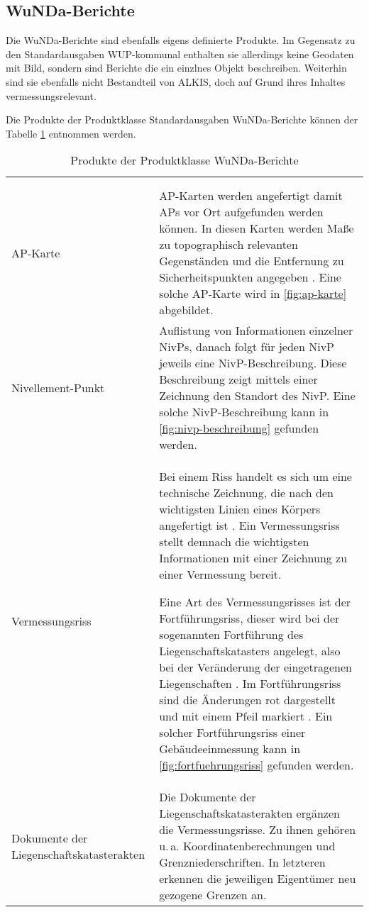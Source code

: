 \subsection{WuNDa-Berichte}
Die WuNDa-Berichte sind ebenfalls eigens definierte Produkte. Im Gegensatz zu den Standardausgaben WUP-kommunal enthalten sie allerdings keine Geodaten mit Bild, sondern sind Berichte die ein einzlnes Objekt beschreiben. Weiterhin sind sie ebenfalls nicht Bestandteil von ALKIS, doch auf Grund ihres Inhaltes vermessungsrelevant.

Die Produkte der Produktklasse Standardausgaben WuNDa-Berichte können der Tabelle \ref{tab-wunda-berichte} entnommen werden.
\begin{longtable}{|p{}|p{}|}	
	\caption{Produkte der Produktklasse WuNDa-Berichte} \label{tab-wunda-berichte} \\
	\hline 
		\rowcolor{gray}
	\head{Produktname}  & \head{Beschreibung} \tabularnewline
	\hline 
	\endfirsthead
	\caption{Produkte der Produktklasse WuNDa-Berichte} \\
	\hline 
		\rowcolor{gray}
	\head{Produktname}  & \head{Beschreibung} \tabularnewline
	\hline 
	\endhead
	AP-Karte
	&
	AP-Karten werden angefertigt damit \acfp{AP} vor Ort aufgefunden werden können. In diesen Karten werden Maße zu topographisch relevanten Gegenständen und die Entfernung zu Sicherheitspunkten angegeben \autocite[vgl.][]{siegen-ap-karte}. Eine solche AP-Karte wird in \vref{fig:ap-karte} abgebildet.
	 \\
	\hline
	Nivellement-Punkt
	&
	Auflistung von Informationen einzelner \acfp{NivP}, danach folgt für jeden NivP jeweils eine NivP-Beschreibung. Diese Beschreibung zeigt mittels einer Zeichnung den Standort des NivP. Eine solche NivP-Beschreibung kann in \ref{fig:nivp-beschreibung} gefunden werden.  \\
	\hline
	Vermessungsriss
	&
	Bei einem Riss handelt es sich um eine technische Zeichnung, die nach den wichtigsten Linien eines Körpers angefertigt ist \autocite[vgl.][]{duden-riss}. Ein Vermessungsriss stellt demnach die wichtigsten Informationen mit einer Zeichnung zu einer Vermessung bereit.
	
	Eine Art des Vermessungsrisses ist der Fortführungsriss, dieser wird bei der sogenannten Fortführung des Liegenschaftskatasters angelegt, also bei der Veränderung der eingetragenen Liegenschaften \autocite[vgl.][]{vermpedia-fortfuehrung}.
	Im Fortführungsriss sind die Änderungen rot dargestellt und mit einem Pfeil markiert \autocite[vgl.][]{stelling-fortfuehrung}. Ein solcher Fortführungsriss einer Gebäudeeinmessung kann in \ref{fig:fortfuehrungsriss} gefunden werden.
	 \\
	\hline
	Dokumente der Liegenschaftskatasterakten
	&
	Die Dokumente der Liegenschaftskatasterakten ergänzen die Vermessungsrisse. Zu ihnen gehören u.\,a. Koordinatenberechnungen und Grenzniederschriften. In letzteren erkennen die jeweiligen Eigentümer neu gezogene Grenzen an.  \\
	\hline
\end{longtable} 
	
